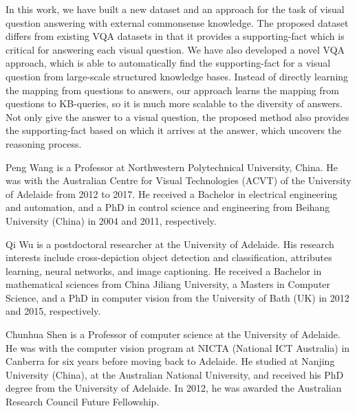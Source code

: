 \documentclass[10pt,journal]{IEEEtran}
\begin{document}
In this work, we have built a new dataset and an approach for the task of visual question answering with external commonsense knowledge.
The proposed \KBName dataset differs from existing VQA datasets in that it provides a supporting-fact which is critical for answering each visual question.
We have also developed a novel VQA approach, which is able to automatically find the supporting-fact
for a visual question from large-scale structured knowledge bases.
Instead of directly learning the mapping from questions to answers, our approach learns the mapping from questions to KB-queries,
so it is much more scalable to the diversity of answers.
Not only give the answer to a visual question, the proposed method also provides the supporting-fact based on which it arrives at the answer,
which uncovers the reasoning process.










{


}


\begin{IEEEbiographynophoto}{Peng Wang}
	is a Professor at Northwestern Polytechnical University, China. He was with 
	the Australian Centre for Visual Technologies (ACVT) of the University of Adelaide from 2012 to 2017. He received a Bachelor in electrical engineering and automation, and a PhD in control science and engineering from Beihang University (China) in 2004 and 2011, respectively.
\end{IEEEbiographynophoto}


\begin{IEEEbiographynophoto}{Qi Wu}
	is a postdoctoral researcher at the University of Adelaide. His research interests include cross-depiction object detection and classification, attributes learning, neural networks, and image captioning. He received a Bachelor in mathematical sciences from China Jiliang University, a Masters in Computer Science, and a PhD in computer vision from the University of Bath (UK) in 2012 and 2015, respectively.
\end{IEEEbiographynophoto}

\begin{IEEEbiographynophoto}{Chunhua Shen}
	is a Professor of computer science at the University of Adelaide. He was with the computer vision program at NICTA (National ICT Australia) in Canberra for six years before moving back to Adelaide. He studied at Nanjing University (China), at the Australian National University, and received his PhD degree from the University of Adelaide. In 2012, he was awarded the Australian Research Council Future Fellowship.
\end{IEEEbiographynophoto}
\end{document}
